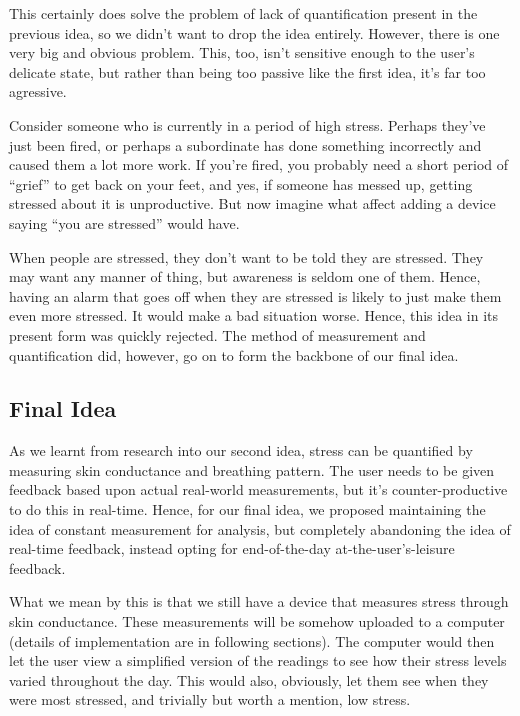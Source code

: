 \documentclass{scrartcl}
\begin{document}
This certainly does solve the problem of lack of quantification present in the previous idea, so we didn't want to drop
the idea entirely. However, there is one very big and obvious problem. This, too, isn't sensitive enough to the user's
delicate state, but rather than being too passive like the first idea, it's far too agressive.

Consider someone who is currently in a period of high stress. Perhaps they've just been fired, or perhaps a subordinate has
done something incorrectly and caused them a lot more work. If you're fired, you probably need a short period of ``grief''
to get back on your feet, and yes, if someone has messed up, getting stressed about it is unproductive. But now imagine what
affect adding a device saying ``you are stressed'' would have.

When people are stressed, they don't want to be told they are stressed. They may want any manner of thing, but awareness
is seldom one of them. Hence, having an alarm that goes off when they are stressed is likely to just make them even more
stressed. It would make a bad situation worse. Hence, this idea in its present form was quickly rejected. The method of
measurement and quantification did, however, go on to form the backbone of our final idea.

\subsection{Final Idea}

As we learnt from research into our second idea, stress can be quantified by measuring skin conductance and breathing pattern.
The user needs to be given feedback based upon actual real-world measurements, but it's counter-productive to do this in
real-time. Hence, for our final idea, we proposed maintaining the idea of constant measurement for analysis,
but completely abandoning the idea of real-time feedback, instead opting for end-of-the-day at-the-user's-leisure feedback.

What we mean by this is that we still have a device that measures stress through skin conductance.
These measurements will be somehow uploaded
to a computer (details of implementation are in following sections). The computer would then let the user view a simplified version
of the readings to see how their stress levels varied throughout the day. This would also, obviously, let them see when
they were most stressed, and trivially but worth a mention, low stress.
\end{document}
